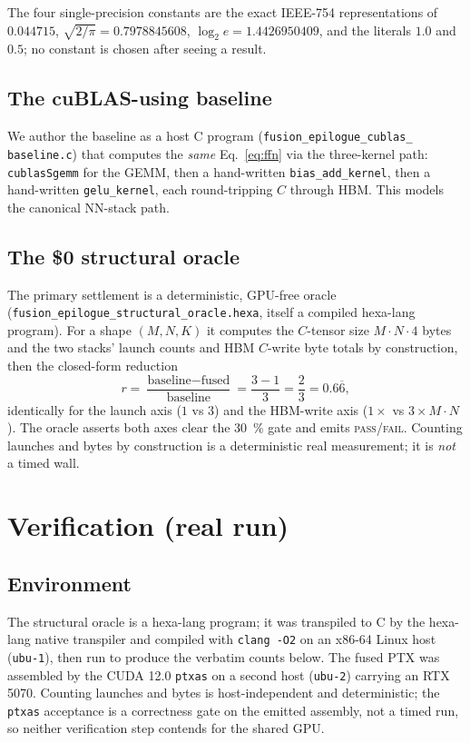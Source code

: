 \documentclass[11pt,a4paper]{article}
\begin{document}
\noindent The four single-precision constants are the exact IEEE-754
representations of $0.044715$, $\sqrt{2/\pi}=0.7978845608$,
$\log_2 e = 1.4426950409$, and the literals $1.0$ and $0.5$; no constant is
chosen after seeing a result.

\subsection{The cuBLAS-using baseline}

We author the baseline as a host C program (\texttt{fusion\_epilogue\_cublas\_%
baseline.c}) that computes the \emph{same} Eq.~\eqref{eq:ffn} via the
three-kernel path: \texttt{cublasSgemm} for the GEMM, then a hand-written
\texttt{bias\_add\_kernel}, then a hand-written \texttt{gelu\_kernel}, each
round-tripping $C$ through HBM. This models the canonical NN-stack path.

\subsection{The \$0 structural oracle}

The primary settlement is a deterministic, GPU-free oracle
(\texttt{fusion\_epilogue\_structural\_oracle.hexa}, itself a compiled
hexa-lang program). For a shape $(M,N,K)$ it computes the $C$-tensor size
$M\!\cdot\!N\!\cdot\!4$ bytes and the two stacks' launch counts and HBM
$C$-write byte totals by construction, then the closed-form reduction
\begin{equation}
r = \frac{\text{baseline} - \text{fused}}{\text{baseline}}
  = \frac{3 - 1}{3} = \frac{2}{3} = 0.6\overline{6},
\label{eq:ratio}
\end{equation}
identically for the launch axis ($1$ vs $3$) and the HBM-write axis
($1\times$ vs $3\times M\!\cdot\!N$). The oracle asserts both axes clear the
\SI{30}{\percent} gate and emits \textsc{pass}/\textsc{fail}. Counting launches
and bytes by construction is a deterministic real measurement; it is
\emph{not} a timed wall.

\section{Verification (real run)}
\label{sec:results}

\subsection{Environment}

The structural oracle is a hexa-lang program; it was transpiled to C by the
hexa-lang native transpiler and compiled with \texttt{clang -O2} on an
x86-64 Linux host (\texttt{ubu-1}), then run to produce the verbatim counts
below. The fused PTX was assembled by the CUDA 12.0 \texttt{ptxas} on a
second host (\texttt{ubu-2}) carrying an RTX 5070. Counting launches and bytes
is host-independent and deterministic; the \texttt{ptxas} acceptance is a
correctness gate on the emitted assembly, not a timed run, so neither
verification step contends for the shared GPU.
\end{document}
